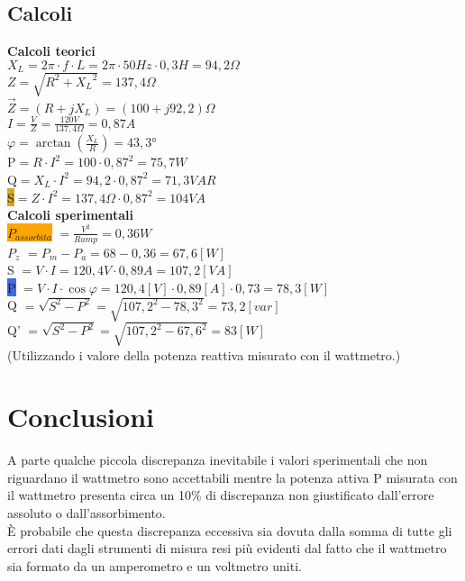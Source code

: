 \documentclass[12pt]{article}
\begin{document}
    \subsection{Calcoli}
    \begin{center}
        \textbf{Calcoli teorici}\\
        \vspace{0.5 cm}
        $X_L = 2\pi \cdot f \cdot L = 2\pi \cdot 50 Hz \cdot 0,3 H= 94,2 \Omega$\\
        $Z=\sqrt{R^2 + {X_L}^2}=137,4 \Omega$\\
        $\vec{Z}=(R+jX_L)=(100+j92,2)\Omega$\\
        $I=\frac{V}{Z}=\frac{120 V}{137,4 \Omega}=0,87 A$\\
    \vspace{0.5 cm}
        $\varphi=\arctan(\frac{X_L}{R})=43,3$°\\
    \vspace{0.5 cm}
        \colorbox{RedOrange}{P}$=R\cdot I^2= 100 \cdot 0,87^2=75,7W$\\
        \colorbox{Dandelion}{Q}$=X_L \cdot  I^2=94,2 \cdot 0,87^2= 71,3 VAR $\\
        \colorbox{Goldenrod}{S}$=Z \cdot I^2= 137,4 \Omega \cdot 0,87^2=104 VA$\\
    \vspace{1 cm}
        \textbf{Calcoli sperimentali}\\
       \colorbox{Orange}{$P_{assorbita}$} $=\frac{V^2}{Ramp}=0,36 W$\\
       \colorbox{Peach}{$P_z$} $=P_m - P_a=68-0,36=67,6[W]$\\
       \vspace{10 mm}
       \colorbox{TealBlue}{S} $=V\cdot I=120,4V \cdot 0,89 A =107,2 [VA]$\\
       \colorbox{RoyalBlue}{P} $=V\cdot I \cdot \cos\varphi=120,4[V] \cdot 0,89[A] \cdot 0,73=78,3[W]$\\
       \colorbox{Blue!85}{Q} $=\sqrt{S^2 - P^2}=\sqrt{107,2^2 - 78,3^2}=73,2 [var]$\\
       \colorbox{Blue!76}{Q'} $=\sqrt{S^2 - P^2}=\sqrt{107,2^2 - 67,6^2}=83 [W] $\\ (Utilizzando i valore della potenza reattiva misurato con il wattmetro.)
    \end{center}
\section{Conclusioni}
A parte qualche piccola discrepanza inevitabile i valori sperimentali che non riguardano il wattmetro sono accettabili mentre la potenza attiva
P misurata con il wattmetro presenta circa un 10\% di discrepanza non giustificato dall'errore assoluto o dall'assorbimento.\\
È probabile che questa discrepanza eccessiva sia dovuta dalla somma di tutte gli errori dati dagli strumenti di misura resi più evidenti dal fatto che 
il wattmetro sia formato da un amperometro e un voltmetro uniti.
\end{document}
